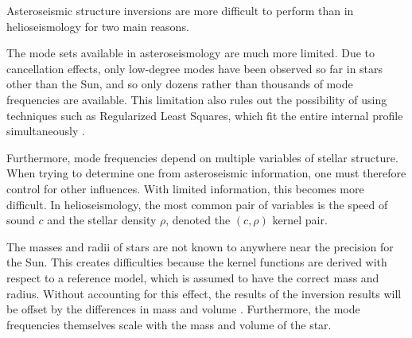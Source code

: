 Asteroseismic structure inversions are more difficult to perform than in helioseismology for two main reasons. 
\begin{description}
    \setlength{\itemindent}{0pt}
    \item[Mode set.]
    The mode sets available in asteroseismology are much more limited. 
    Due to cancellation effects, only low-degree modes have been observed so far in stars other than the Sun, and so only dozens rather than thousands of mode frequencies are available. 
    This limitation also rules out the possibility of using techniques such as Regularized Least Squares, which fit the entire internal profile simultaneously \citep[see, e.g.,][]{basuchaplin2017}. 
    
    Furthermore, mode frequencies depend on multiple variables of stellar structure.
    When trying to determine one from asteroseismic information, one must therefore control for other influences. 
    With limited information, this becomes more difficult. 
    In helioseismology, the most common pair of variables is the speed of sound $c$ and the stellar density $\rho$, denoted the ${(c,\rho)}$ kernel pair. 
    
    \item[Mass and radius.]
    The masses and radii of stars are not known to anywhere near the precision for the Sun. 
    This creates difficulties because the kernel functions are derived with respect to a reference model, which is assumed to have the correct mass and radius. 
    Without accounting for this effect, the results of the inversion results will be offset by the differences in mass and volume \citep[][]{2003Ap&SS.284..153B}. 
    Furthermore, the mode frequencies themselves scale with the mass and volume of the star. 
\end{description}

